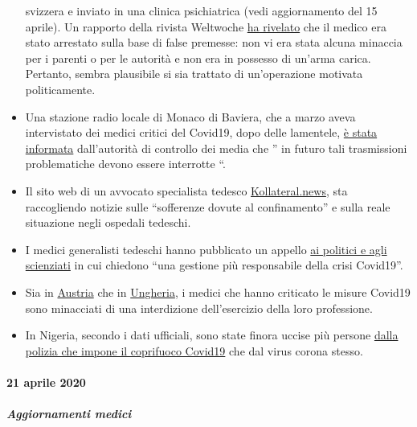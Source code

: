 \begin{itemize}
  svizzera e inviato in una clinica psichiatrica (vedi aggiornamento del
  15 aprile). Un rapporto della rivista Weltwoche
  \href{https://uncut-news.ch/wp-content/uploads/2020/04/Wer-l\%C3\%B6ste-den-Fehlalarm-aus.pdf}{ha
  rivelato} che il medico era stato arrestato sulla base di false
  premesse: non vi era stata alcuna minaccia per i parenti o per le
  autorità e non era in possesso di un'arma carica. Pertanto, sembra
  plausibile si sia trattato di un'operazione motivata politicamente.
\item
  Una stazione radio locale di Monaco di Baviera, che a marzo aveva
  intervistato dei medici critici del Covid19, dopo delle lamentele,
  \href{https://norberthaering.de/medienversagen/radiomuenchen-blm-meinungsvielfalt/}{è
  stata informata} dall'autorità di controllo dei media che '' in futuro
  tali trasmissioni problematiche devono essere interrotte ``.
\item
  Il sito web di un avvocato specialista tedesco
  \href{https://kollateral.news/}{Kollateral.news}, sta raccogliendo
  notizie sulle ``sofferenze dovute al confinamento'' e sulla reale
  situazione negli ospedali tedeschi.
\item
  I medici generalisti tedeschi hanno pubblicato un appello
  \href{https://aerzteinnenvorort.de/der-appell}{ai politici e agli
  scienziati} in cui chiedono ``una gestione più responsabile della
  crisi Covid19''.
\item
  Sia in
  \href{https://www.sn.at/panorama/oesterreich/arzt-droht-berufsverbot-wegen-kritik-an-corona-massnahmen-86594140}{Austria}
  che in
  \href{https://magyarhang.org/belfold/2020/04/16/etikai-vizsgalat-indul-az-orvos-ellen-aki-szerint-nincs-jarvany-es-az-idosek-csak-a-felelemtol-halnak-meg/}{Ungheria},
  i medici che hanno criticato le misure Covid19 sono minacciati di una
  interdizione dell'esercizio della loro professione.
\item
  In Nigeria, secondo i dati ufficiali, sono state finora uccise più
  persone \href{https://www.bbc.com/news/world-africa-52317196}{dalla
  polizia che impone il coprifuoco Covid19} che dal virus corona stesso.
\end{itemize}

\hypertarget{21-aprile-2020}{%
\paragraph{21 aprile 2020}\label{21-aprile-2020}}

\hypertarget{aggiornamenti-medici-2}{%
\subparagraph{\texorpdfstring{\textbf{Aggiornamenti
medici}}{Aggiornamenti medici}}\label{aggiornamenti-medici-2}}

